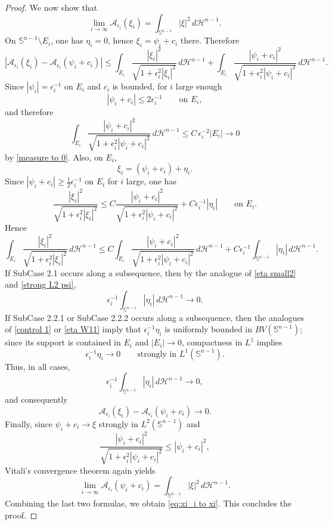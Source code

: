 \documentclass[reqno,11pt]{amsart}
\numberwithin{equation}{section}
\theoremstyle{remark}
\begin{document}
\begin{proof}
We now show that
$$
\lim_{i\to\infty} \mathcal  A_{\epsilon_i}(\xi_i)=\int_{\mathbb S^{n-1}} |\xi|^2\,d\mathscr H^{n-1}.
$$
On $\mathbb S^{n-1}\setminus E_i$, one has $\eta_i=0$, hence $\xi_i=\psi_i+c_i$ there. Therefore
$$
|\mathcal A_{\epsilon_i}(\xi_i)-\mathcal A_{\epsilon_i}(\psi_i+c_i)|
\le
\int_{E_i}\frac{|\xi_i|^2}{\sqrt{1+\epsilon_i^2|\xi_i|^2}}\,d\mathscr H^{n-1}
+
\int_{E_i}\frac{|\psi_i+c_i|^2}{\sqrt{1+\epsilon_i^2|\psi_i+c_i|^2}}\,d\mathscr H^{n-1}.
$$
Since $|\psi_i|=\epsilon_i^{-1}$ on $E_i$ and $c_i$ is bounded, for $i$ large enough
$$
|\psi_i+c_i|\le 2\epsilon_i^{-1}\qquad\text{on }E_i,
$$
and therefore
$$
\int_{E_i}\frac{|\psi_i+c_i|^2}{\sqrt{1+\epsilon_i^2|\psi_i+c_i|^2}}\,d\mathscr H^{n-1}
\le C\,\epsilon_i^{-2}|E_i|\to 0
$$
by \eqref{measure to 0}. Also, on $E_i$,
$$
\xi_i=(\psi_i+c_i)+\eta_i.
$$
Since $|\psi_i+c_i|\ge \frac{1}{2}\epsilon_i^{-1}$ on $E_i$ for $i$ large, one has
$$
\frac{|\xi_i|^2}{\sqrt{1+\epsilon_i^2|\xi_i|^2}}
\le C\frac{|\psi_i+c_i|^2}{\sqrt{1+\epsilon_i^2|\psi_i+c_i|^2}}+C\epsilon_i^{-1}|\eta_i|
\qquad\text{on }E_i.
$$
Hence
$$
\int_{E_i}\frac{|\xi_i|^2}{\sqrt{1+\epsilon_i^2|\xi_i|^2}}\,d\mathscr H^{n-1}
\le
C\int_{E_i}\frac{|\psi_i+c_i|^2}{\sqrt{1+\epsilon_i^2|\psi_i+c_i|^2}}\,d\mathscr H^{n-1}
+
C\epsilon_i^{-1}\int_{\mathbb S^{n-1}}|\eta_i|\,d\mathscr H^{n-1}.
$$
If SubCase 2.1 occurs along a subsequence, then by the analogue of \eqref{eta small2} and \eqref{strong L2 psi},
$$
\epsilon_i^{-1}\int_{\mathbb S^{n-1}}|\eta_i|\,d\mathscr H^{n-1}\to 0.
$$
If SubCase 2.2.1 or SubCase 2.2.2 occurs along a subsequence, then the analogues of \eqref{control 1} or \eqref{eta W11} imply that $\epsilon_i^{-1}\eta_i$ is uniformly bounded in $BV(\mathbb S^{n-1})$; since its support is contained in $E_i$ and $|E_i|\to 0$, compactness in $L^1$ implies
$$
\epsilon_i^{-1}\eta_i\to 0 \qquad\text{strongly in }L^1(\mathbb S^{n-1}).
$$
Thus, in all cases,
$$
\epsilon_i^{-1}\int_{\mathbb S^{n-1}}|\eta_i|\,d\mathscr H^{n-1}\to 0,
$$
and consequently
$$
\mathcal A_{\epsilon_i}(\xi_i)-\mathcal A_{\epsilon_i}(\psi_i+c_i)\to 0.
$$
Finally, since $\psi_i+c_i\to \xi$ strongly in $L^2(\mathbb S^{n-1})$ and
$$
\frac{|\psi_i+c_i|^2}{\sqrt{1+\epsilon_i^2|\psi_i+c_i|^2}}
\le |\psi_i+c_i|^2,
$$
Vitali's convergence theorem again yields
$$
\lim_{i\to \infty} \mathcal A_{\epsilon_i}(\psi_i+c_i)
=
\int_{\mathbb S^{n-1}} |\xi|^2\,d\mathscr H^{n-1}.
$$
Combining the last two formulae, we obtain \eqref{eq:xi_i to xi}. This concludes the proof.
 


\end{proof}
\end{document}
